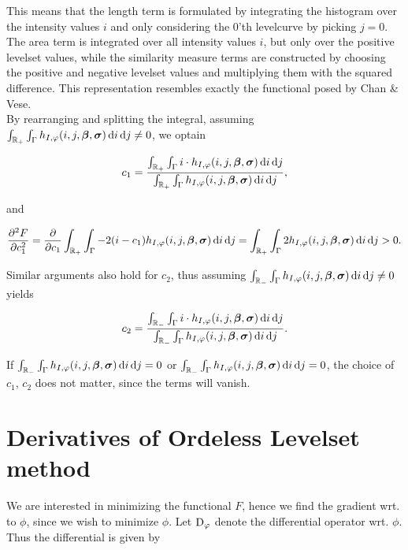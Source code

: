 This means that the length term is formulated by integrating the histogram over the intensity values $i$ and only considering the 0'th levelcurve by picking $j=0$. The area term is integrated over all intensity values $i$, but only over the positive levelset values, while the similarity measure terms are constructed by choosing the positive and negative levelset values and multiplying them with the squared difference. This representation resembles exactly the functional posed by Chan \& Vese.\\

By rearranging and splitting the integral, assuming $\int_{\mathbb R_+}\int_{\Gamma}h_{I,\varphi}(i,j,\boldsymbol{\beta} ,\boldsymbol{\sigma} ) \,{\rm d} i\,{\rm d} j\neq 0$, we optain

\begin{equation}
c_1 = \frac{\int_{\mathbb R_+}  \int_{\Gamma}i\cdot h_{I,\varphi}(i,j,\boldsymbol{\beta} ,\boldsymbol{\sigma} ) \,{\rm d} i\,{\rm d} j}{\int_{\mathbb R_+}\int_{\Gamma}h_{I,\varphi}(i,j,\boldsymbol{\beta} ,\boldsymbol{\sigma} ) \,{\rm d} i\,{\rm d} j},
\end{equation}

and 

\begin{equation}
\frac{\partial^2 F}{\partial c_1^2} = \frac{\partial}{\partial c_1}\int_{\mathbb R_+}\int_{\Gamma}-2(i-c_1) h_{I,\varphi}(i,j,\boldsymbol{\beta} ,\boldsymbol{\sigma} ) \,{\rm d} i\,{\rm d} j = \int_{\mathbb R_+}\int_{\Gamma}2 h_{I,\varphi}(i,j,\boldsymbol{\beta} ,\boldsymbol{\sigma} ) \,{\rm d} i\,{\rm d} j>0.
\end{equation}

Similar arguments also hold for $c_2$, thus assuming $\int_{\mathbb R_-}\int_{\Gamma}h_{I,\varphi}(i,j,\boldsymbol{\beta} ,\boldsymbol{\sigma} ) \,{\rm d} i\,{\rm d} j\neq 0$ yields

\begin{equation}
c_2 = \frac{\int_{\mathbb R_-}\int_{\Gamma} i\cdot h_{I,\varphi}(i,j,\boldsymbol{\beta} ,\boldsymbol{\sigma} ) \,{\rm d} i\,{\rm d} j}{\int_{\mathbb R_-}\int_{\Gamma}h_{I,\varphi}(i,j,\boldsymbol{\beta} ,\boldsymbol{\sigma} ) \,{\rm d} i\,{\rm d} j}.
\end{equation}

If $\int_{\mathbb R_-}\int_{\Gamma}h_{I,\varphi}(i,j,\boldsymbol{\beta} ,\boldsymbol{\sigma} ) \,{\rm d} i\,{\rm d} j=0$ or $\int_{\mathbb R_-}\int_{\Gamma}h_{I,\varphi}(i,j,\boldsymbol{\beta} ,\boldsymbol{\sigma} ) \,{\rm d} i\,{\rm d} j = 0$, the choice of $c_1$, $c_2$ does not matter, since the terms will vanish.


\section{Derivatives of Ordeless Levelset method}\label{section:OLder}
We are interested in minimizing the functional $F$, hence we find the gradient wrt. to $\phi$, since we wish to minimize $\phi$. Let ${\rm D}_\varphi$ denote the differential operator wrt. $\phi$. Thus the differential is given by

